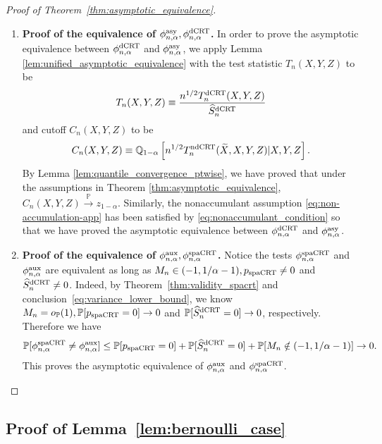 \documentclass[12pt]{article}
\theoremstyle{definition}
\def\P{\mathbb{P}}
\def\P{\mathbb{P}}
\renewcommand{\P}{\mathbb{P}}							%
\newcommand{\Q}{\mathbb{Q}}								%
\newcommand{\convp}{\overset{\mathbb{P}}{\rightarrow}}             %
\newcommand{\srx}{X}									%
\newcommand{\srz}{Z}									%
\newcommand{\srxk}{\widetilde X}						%
\newcommand{\sry}{Y}									%
\newcommand{\dCRT}{\textnormal{dCRT}} 					%
\newcommand{\ndCRThat}{\textnormal{ndCRT}}	%
\newcommand{\spacrt}{\textnormal{spaCRT}}               %
\newcommand{\aux}{\textnormal{aux}}               %
\newcommand{\asy}{\textnormal{asy}}              %
\begin{document}
\begin{proof}[Proof of Theorem~\ref{thm:asymptotic_equivalence}]
\begin{enumerate}
	\item \textbf{Proof of the equivalence of $\phi_{n,\alpha}^{\asy},\phi_{n,\alpha}^{\dCRT}$.} In order to prove the asymptotic equivalence between $\phi_{n,\alpha}^{\dCRT}$ and $\phi_{n,\alpha}^{\asy}$, we apply Lemma \ref{lem:unified_asymptotic_equivalence} with the test statistic $T_n(\srx,\sry,\srz)$ to be
	\begin{align*}
	  T_n(\srx,\sry,\srz)\equiv\frac{n^{1/2}T_n^{\dCRT}(\srx,\sry,\srz)}{\widehat{S}_n^{\dCRT}}
	\end{align*}
	and cutoff $C_n(\srx,\sry,\srz)$ to be 
	\begin{align*}
	  C_n(\srx,\sry,\srz)\equiv \Q_{1-\alpha}\left[n^{1/2}T_n^{\ndCRThat}(\srxk, \srx, \sry,\srz)|\srx,\sry,\srz\right].
	\end{align*}
	By Lemma \ref{lem:quantile_convergence_ptwise}, we have proved that under the assumptions in Theorem \ref{thm:asymptotic_equivalence}, $C_n(\srx,\sry,\srz)\convp z_{1-\alpha}$. Similarly, the nonaccumulant assumption \eqref{eq:non-accumulation-app} has been satisfied by \eqref{eq:nonaccumulant_condition} so that we have proved the asymptotic equivalence between $\phi_{n,\alpha}^{\dCRT}$ and $\phi_{n,\alpha}^{\asy}$.
	
	\item\textbf{Proof of the equivalence of $\phi_{n,\alpha}^{\aux},\phi_{n,\alpha}^{\spacrt}$.} Notice the tests $\phi_{n,\alpha}^{\spacrt}$ and $\phi_{n,\alpha}^{\aux}$ are equivalent as long as $M_n \in (-1, 1/\alpha - 1),p_{\spacrt}\neq 0$ and $\widehat S_n^{\dCRT}\neq 0$. Indeed, by Theorem~\ref{thm:validity_spacrt} and conclusion~\eqref{eq:variance_lower_bound}, we know $M_n=o_{\P}(1),\P[p_{\spacrt}=0]\rightarrow0$ and $\P[\widehat S_n^{\dCRT}=0]\rightarrow0$, respectively. Therefore we have 
	\small
	\begin{align*}
	  \P[\phi_{n,\alpha}^{\spacrt}\neq \phi_{n,\alpha}^{\aux}]\leq \P[p_{\spacrt}=0]+\P[\widehat S_n^{\dCRT}=0]+\P[M_n \notin (-1, 1/\alpha - 1)]\rightarrow0.
	\end{align*}
	\normalsize
	This proves the asymptotic equivalence of $\phi_{n,\alpha}^{\aux}$ and $\phi_{n,\alpha}^{\spacrt}$.
\end{enumerate}
\end{proof}

\subsection{Proof of Lemma~\ref{lem:bernoulli_case}}
\end{document}
